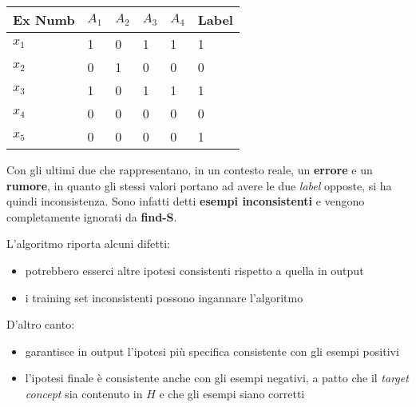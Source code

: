 \begin{table}[h]
\centering
\begin{tabular}{|l|l|l|l|l|l|}
\hline
\textbf{Ex Numb} & \textbf{$A_1$} & \textbf{$A_2$} & \textbf{$A_3$} & \textbf{$A_4$} & \textbf{Label} \\ \hline
\textbf{$x_1$}     & 1            & 0            & 1            & 1            & 1              \\ \hline
\textbf{$x_2$}     & 0            & 1            & 0            & 0            & 0              \\ \hline
\textbf{$x_3$}     & 1            & 0            & 1            & 1            & 1              \\ \hline
\textbf{$x_4$}     & 0            & 0            & 0            & 0            & 0              \\ \hline
\textbf{$x_5$}     & 0            & 0            & 0            & 0            & 1              \\ \hline
\end{tabular}
\end{table}
Con gli ultimi due che rappresentano, in un contesto reale, un \textbf{errore} e un \textbf{rumore}, in quanto gli stessi valori portano ad avere le due \textit{label} opposte, si ha quindi inconsistenza. Sono infatti detti \textbf{esempi inconsistenti} e vengono completamente ignorati da \textbf{find-S}.

L'algoritmo riporta alcuni difetti:
\begin{itemize} 
    \item potrebbero esserci altre ipotesi consistenti rispetto a quella in output 
    \item i training set inconsistenti possono ingannare l'algoritmo 
\end{itemize} D'altro canto: 
\begin{itemize} 
    \item garantisce in output l'ipotesi più specifica consistente con gli esempi positivi 
    \item l'ipotesi finale è consistente anche con gli esempi negativi, a patto che il \textit{target concept} sia contenuto in $H$ e che gli esempi siano corretti 
\end{itemize}
